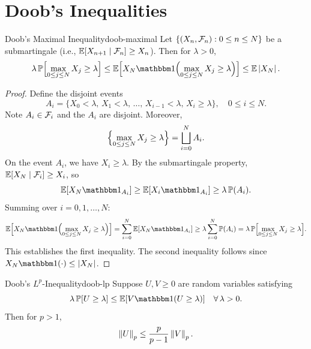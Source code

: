 \section{Doob's Inequalities}

\begin{theorem}{Doob's Maximal Inequality}{doob-maximal}
    Let $\{(X_n, \mathcal{F}_n) : 0 \leq n \leq N\}$ be a submartingale (i.e., $\mathbb{E}[X_{n+1} \mid \mathcal{F}_n] \geq X_n$). Then for $\lambda > 0$,
    \[
        \lambda \, \Prob\Bigl[\max_{0 \leq j \leq N} X_j \geq \lambda\Bigr] \leq \E\Bigl[X_N \ind\Bigl(\max_{0 \leq j \leq N} X_j \geq \lambda\Bigr)\Bigr] \leq \E\abs{X_N}.
    \]
\end{theorem}

\begin{proof}
    Define the disjoint events
    \[
        A_i = \{X_0 < \lambda, \, X_1 < \lambda, \, \ldots, \, X_{i-1} < \lambda, \, X_i \geq \lambda\}, \quad 0 \leq i \leq N.
    \]
    Note $A_i \in \mathcal{F}_i$ and the $A_i$ are disjoint. Moreover,
    \[
        \Bigl\{\max_{0 \leq j \leq N} X_j \geq \lambda\Bigr\} = \bigsqcup_{i=0}^{N} A_i.
    \]
    On the event $A_i$, we have $X_i \geq \lambda$. By the submartingale property, $\mathbb{E}[X_N \mid \mathcal{F}_i] \geq X_i$, so
    \[
        \E[X_N \ind_{A_i}] \geq \E[X_i \ind_{A_i}] \geq \lambda \, \Prob(A_i).
    \]
    Summing over $i = 0, 1, \ldots, N$:
    \[
        \E\Bigl[X_N \ind\Bigl(\max_{0 \leq j \leq N} X_j \geq \lambda\Bigr)\Bigr] = \sum_{i=0}^{N} \E[X_N \ind_{A_i}] \geq \lambda \sum_{i=0}^{N} \Prob(A_i) = \lambda \, \Prob\Bigl[\max_{0 \leq j \leq N} X_j \geq \lambda\Bigr].
    \]
    This establishes the first inequality. The second inequality follows since $X_N \ind(\cdot) \leq \abs{X_N}$.
\end{proof}

\begin{theorem}{Doob's \texorpdfstring{$L^p$}{Lp}-Inequality}{doob-lp}
    Suppose $U, V \geq 0$ are random variables satisfying
    \[
        \lambda \, \Prob[U \geq \lambda] \leq \E[V \ind(U \geq \lambda)] \quad \forall\, \lambda > 0.
    \]
    Then for $p > 1$,
    \[
        \left\|U\right\|_p \leq \frac{p}{p-1} \left\|V\right\|_p.
    \]
\end{theorem}

